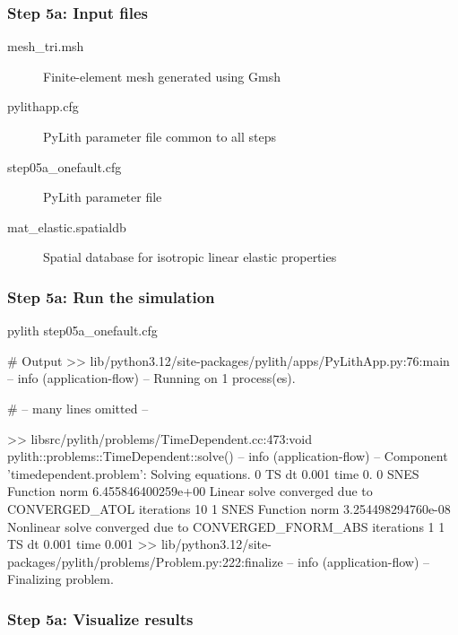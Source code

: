 \documentclass[aspectratio=169]{beamer}
\begin{document}
\begin{frame}
  \frametitle{Step 5a: Input files}
  \summary{}

  \begin{description}
  \item[mesh\_tri.msh] Finite-element mesh generated using Gmsh
  \item[pylithapp.cfg] PyLith parameter file common to all steps
  \item[step05a\_onefault.cfg] PyLith parameter file
  \item[mat\_elastic.spatialdb] Spatial database for isotropic linear elastic properties
  \end{description}
    
\end{frame}


\begin{frame}[fragile]
  \frametitle{Step 5a: Run the simulation}
  \summary{}

\begin{pyrejournal}
pylith step05a_onefault.cfg

# Output
 >> lib/python3.12/site-packages/pylith/apps/PyLithApp.py:76:main
 -- info (application-flow)
 -- Running on 1 process(es).

# -- many lines omitted --

 >> libsrc/pylith/problems/TimeDependent.cc:473:void pylith::problems::TimeDependent::solve()
 -- info (application-flow)
 -- Component 'timedependent.problem': Solving equations.
0 TS dt 0.001 time 0.
    0 SNES Function norm 6.455846400259e+00
      Linear solve converged due to CONVERGED_ATOL iterations 10
    1 SNES Function norm 3.254498294760e-08
    Nonlinear solve converged due to CONVERGED_FNORM_ABS iterations 1
1 TS dt 0.001 time 0.001
 >> lib/python3.12/site-packages/pylith/problems/Problem.py:222:finalize
 -- info (application-flow)
 -- Finalizing problem.
\end{pyrejournal}
  
\end{frame}


\begin{frame}
  \frametitle{Step 5a: Visualize results}

    
\end{frame}
\end{document}
